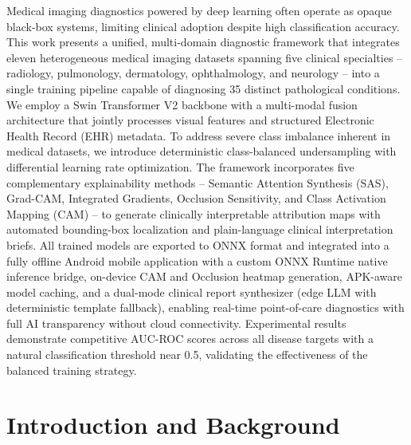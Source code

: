 \documentclass[12pt,a4paper]{report}
\begin{document}
Medical imaging diagnostics powered by deep learning often operate as opaque black-box systems, limiting clinical adoption despite high classification accuracy. This work presents a unified, multi-domain diagnostic framework that integrates eleven heterogeneous medical imaging datasets spanning five clinical specialties -- radiology, pulmonology, dermatology, ophthalmology, and neurology -- into a single training pipeline capable of diagnosing 35 distinct pathological conditions. We employ a Swin Transformer V2 backbone with a multi-modal fusion architecture that jointly processes visual features and structured Electronic Health Record (EHR) metadata. To address severe class imbalance inherent in medical datasets, we introduce deterministic class-balanced undersampling with differential learning rate optimization. The framework incorporates five complementary explainability methods -- Semantic Attention Synthesis (SAS), Grad-CAM, Integrated Gradients, Occlusion Sensitivity, and Class Activation Mapping (CAM) -- to generate clinically interpretable attribution maps with automated bounding-box localization and plain-language clinical interpretation briefs. All trained models are exported to ONNX format and integrated into a fully offline Android mobile application with a custom ONNX Runtime native inference bridge, on-device CAM and Occlusion heatmap generation, APK-aware model caching, and a dual-mode clinical report synthesizer (edge LLM with deterministic template fallback), enabling real-time point-of-care diagnostics with full AI transparency without cloud connectivity. Experimental results demonstrate competitive AUC-ROC scores across all disease targets with a natural classification threshold near 0.5, validating the effectiveness of the balanced training strategy.

\newpage
\tableofcontents
\newpage
\listoffigures
\newpage
\listoftables

\newpage
{}

\chapter{Introduction and Background}
\end{document}
